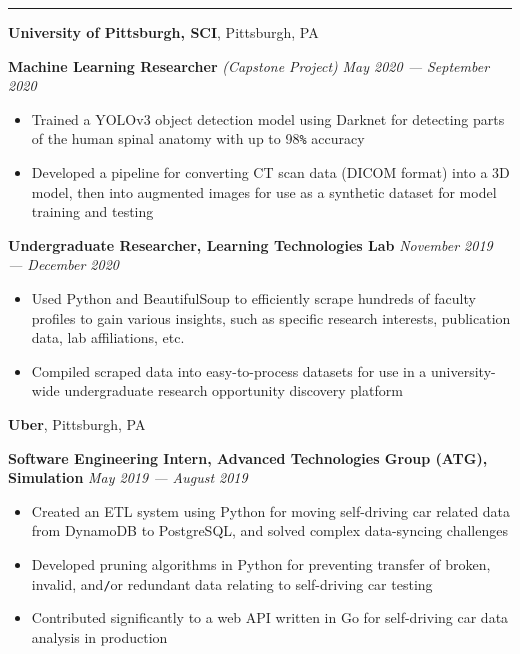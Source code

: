\documentclass[10pt]{article}
\begin{document}
\begin{flushleft}
		\hrule

		\vspace{2.25mm}
		\textbf{University of Pittsburgh, SCI}, Pittsburgh, PA\\
		\begin{leftli}
         {\small \textbf{Machine Learning Researcher} \textit{(Capstone Project)}}  \hfill \textit{\small May 2020 --- September 2020}
			\begin{itemize}
				\item Trained a YOLOv3 object detection model using Darknet for detecting parts of the human spinal anatomy with up to 98\verb!%! accuracy
				\vspace{-2mm}
				\item Developed a pipeline for converting CT scan data (DICOM format) into a 3D model, then into augmented images for use as a synthetic dataset for model training and testing
			\end{itemize}
		\end{leftli}

		\begin{leftli}
			{\small \textbf{Undergraduate Researcher, Learning Technologies Lab}} \hfill \textit{\small November 2019 --- December 2020}
			\begin{itemize}
				\item Used Python and BeautifulSoup to efficiently scrape hundreds of faculty profiles to gain various insights, such as specific research interests, publication data, lab affiliations, etc.
				\vspace{-2mm}
				\item Compiled scraped data into easy-to-process datasets for use in a university-wide undergraduate research opportunity discovery platform
			\end{itemize}
		\end{leftli}

		\vspace{-1.50mm}
		\textbf{Uber}, Pittsburgh, PA\\
		\begin{leftli}
			{\small \textbf{Software Engineering Intern, Advanced Technologies Group (ATG), Simulation}} \hfill \textit{\small May 2019 --- August 2019}
			\begin{itemize}
				\item Created an ETL system using Python for moving self-driving car related data from DynamoDB to PostgreSQL, and solved complex data-syncing challenges
				\vspace{-2mm}
				\item Developed pruning algorithms in Python for preventing transfer of broken, invalid, and\texttt{/}or redundant data relating to self-driving car testing
				\vspace{-2mm}
				\item Contributed significantly to a web API written in Go for self-driving car data analysis in production
			\end{itemize}
		\end{leftli}


\end{flushleft}
\end{document}
